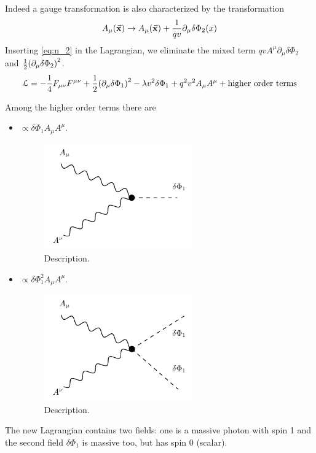 \documentclass[../main/main.tex]{subfiles}
\begin{document}
Indeed a gauge transformation is also characterized  by the transformation
\begin{equation}
  A _ \mu (\va{x}) \rightarrow A _ \mu (\va{x}) + \frac{1}{qv} \partial_ \mu \delta \Phi _2 (x)
  \label{eq:n_2}
\end{equation}
Inserting \eqref{eq:n_2} in the Lagrangian, we eliminate the mixed term \( q v A ^ \mu  \partial_ \mu  \delta \Phi _2  \) and \( \frac{1}{2} \qty(\partial _ \mu  \delta \Phi _2 )^2  \).
\begin{equation}
  \mathcal{L} = - \frac{1}{4} F _{\mu \nu } F ^ {\mu \nu } + \frac{1}{2} \qty(\partial _ \mu  \delta \Phi _1 )^2 - \lambda v^2 \delta \Phi _1
  + q^2 v^2 A_ \mu A ^ \mu  + \text{higher order terms}
\end{equation}
\begin{remark}
Among the higher order terms there are
\begin{itemize}
\item \( \propto \delta \Phi _1 A_ \mu A ^ \mu  \).
\begin{figure}[h!]
\centering
\includegraphics[width=0.6\textwidth]{../lessons/n_image/5.pdf}
\caption{\label{fig:} Description.}
\end{figure}

\item \( \propto \delta \Phi _1 ^2 A _ \mu A ^ \mu  \).
\begin{figure}[h!]
\centering
\includegraphics[width=0.6\textwidth]{../lessons/n_image/6.pdf}
\caption{\label{fig:} Description.}
\end{figure}

\end{itemize}
\end{remark}
The new Lagrangian contains two fields: one is a massive photon with spin 1 and the second field \( \delta \Phi _1 \) is massive too, but has spin 0 (scalar).
\end{document}
